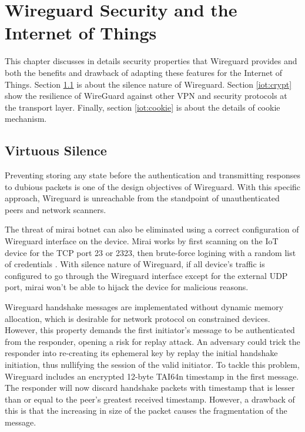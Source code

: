 \chapter{Wireguard Security and the Internet of Things} \label{chap:eval}
  This chapter discusses in details security properties that Wireguard provides and both the benefits
  and drawback of adapting these features for the Internet of Things. Section \ref{iot:silence} is
  about the silence nature of Wireguard. Section \ref{iot:crypt} show the resilience of WireGuard
  against other VPN and security protocols at the transport layer. Finally, section \ref{iot:cookie} is about the details of 
  cookie mechanism. 
\section{Virtuous Silence} \label{iot:silence}
  Preventing storing any state before the authentication and transmitting responses to dubious packets
  is one of the design objectives of Wireguard. With this specific approach, Wireguard is unreachable
  from the standpoint of unauthenticated peers and network scanners. 

  The threat of mirai botnet can also be eliminated using a correct configuration of 
  Wireguard interface on the device. Mirai works by first scanning on the IoT device for
  the TCP port 23 or 2323, then brute-force logining with a random list of credentials \cite{botnet}.
  With silence nature of Wireguard, if all device's traffic is configured to go through the
  Wireguard interface except for the external UDP port, mirai won't be able to hijack the
  device for malicious reasons.

  Wireguard handshake messages are implementated without dynamic memory allocation, which is
  desirable for network protocol on constrained devices. However, this property demands the
  first initiator's message to be authenticated  from the responder, opening a risk for
  replay attack. An adversary could trick the responder into re-creating its ephemeral key
  by replay the initial handshake initiation, thus nullifying the session of the valid initiator.
  To tackle this problem, Wireguard includes an encrypted 12-byte TAI64n \cite{tai64} timestamp 
  in the first message. The responder will now discard handshake packets with timestamp that 
  is lesser than or equal to the peer's greatest received timestamp. However, a drawback of 
  this is that the increasing in size of the packet causes the fragmentation of the message.
